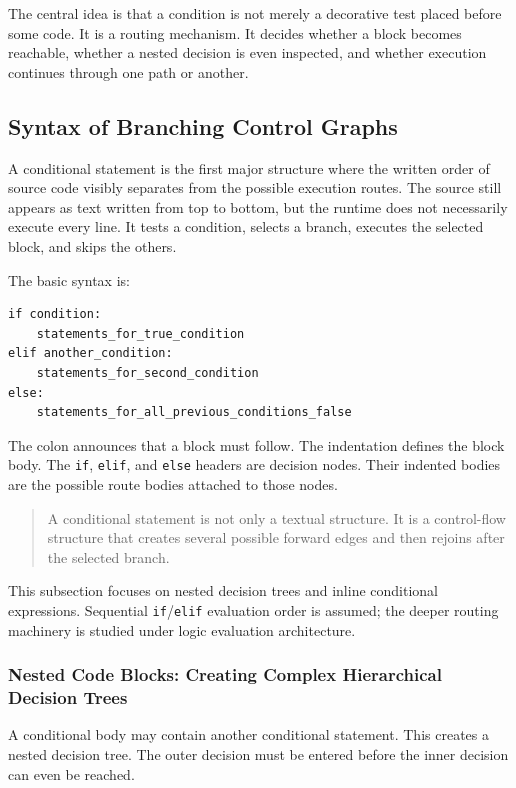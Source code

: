 \documentclass[a4paper,twoside]{report}
\begin{document}
The central idea is that a condition is not merely a decorative test placed before some code. It is a routing mechanism. It decides whether a block becomes reachable, whether a nested decision is even inspected, and whether execution continues through one path or another.

\subsection{Syntax of Branching Control Graphs}

A conditional statement is the first major structure where the written order of source code visibly separates from the possible execution routes. The source still appears as text written from top to bottom, but the runtime does not necessarily execute every line. It tests a condition, selects a branch, executes the selected block, and skips the others.

The basic syntax is:

\begin{verbatim}
if condition:
    statements_for_true_condition
elif another_condition:
    statements_for_second_condition
else:
    statements_for_all_previous_conditions_false
\end{verbatim}

The colon announces that a block must follow. The indentation defines the block body. The \texttt{if}, \texttt{elif}, and \texttt{else} headers are decision nodes. Their indented bodies are the possible route bodies attached to those nodes.

\begin{quote}
A conditional statement is not only a textual structure. It is a control-flow structure that creates several possible forward edges and then rejoins after the selected branch.
\end{quote}

This subsection focuses on nested decision trees and inline conditional expressions. Sequential \texttt{if}/\texttt{elif} evaluation order is assumed; the deeper routing machinery is studied under logic evaluation architecture.

\subsubsection{Nested Code Blocks: Creating Complex Hierarchical Decision Trees}

A conditional body may contain another conditional statement. This creates a nested decision tree. The outer decision must be entered before the inner decision can even be reached.
\end{document}
